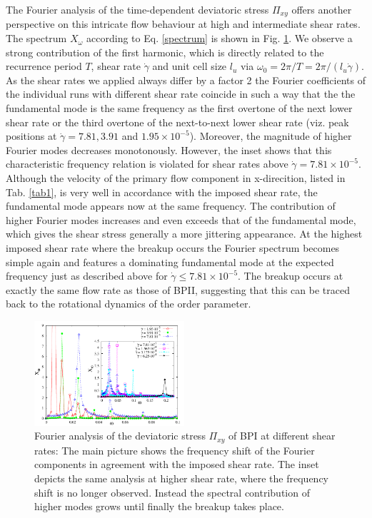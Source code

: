 \documentclass[aps,pre,reprint,superscriptaddress, twocolumn]{revtex4}
\newcommand{\e}[1]{\times10^{#1}}
\newcommand{\gd}{\dot{\gamma}}
\begin{document}
The Fourier analysis of the time-dependent deviatoric stress $\Pi_{xy}$ 
offers another perspective on this intricate flow behaviour at high and intermediate shear rates. 
The spectrum $X_\omega$ according to Eq. \ref{spectrum} is shown in Fig. \ref{bp1-spectrum}.
We observe a strong contribution of the first harmonic, which is directly related to the 
recurrence period $T$, shear rate $\dot{\gamma}$ and unit cell size $l_{u}$ 
via $\omega_0=2\pi/T=2\pi/(l_{u}\dot{\gamma})$.
As the shear rates we applied always differ by a factor 2 the Fourier coefficients of the 
individual runs with different shear rate coincide in such a way that the
the fundamental mode is the same frequency as the first overtone of the next lower shear rate
or the third overtone of the next-to-next lower shear rate 
(viz. peak positions at $\gd=7.81, 3.91$ and $1.95\e{-5}$).
Moreover, the magnitude of higher Fourier modes decreases monotonously.   
However, the inset shows that this characteristic frequency relation is violated 
for shear rates above $\gd=7.81\e{-5}$.
Although the velocity of the primary flow component in x-direcition, listed in Tab. \ref{tab1},
 is very well in accordance with the imposed shear rate, the fundamental mode appears 
now at the same frequency.
The contribution of higher Fourier modes increases and even exceeds that of
the fundamental mode, which gives the shear stress generally a more jittering appearance.
At the highest imposed shear rate where the breakup occurs the Fourier spectrum 
becomes simple again and features a dominating fundamental mode at the 
expected frequency just as described above for $\gd\le7.81\e{-5}$.
The breakup occurs at exactly the same flow rate as those of BPII, 
suggesting that this can be traced back to the rotational dynamics 
of the order parameter.

\begin{figure}[ht]
\includegraphics[width=0.495\textwidth]{spectrum_bp1.pdf}
\caption{Fourier analysis of the deviatoric stress $\Pi_{xy}$ of BPI at different shear rates: The main picture shows the frequency shift of the Fourier components in agreement with the imposed shear rate. The inset depicts the same analysis at higher shear rate, where the frequency shift is no longer observed. Instead the spectral contribution of higher modes grows until finally the breakup takes place.}
\label{bp1-spectrum}
\end{figure}
\end{document}
